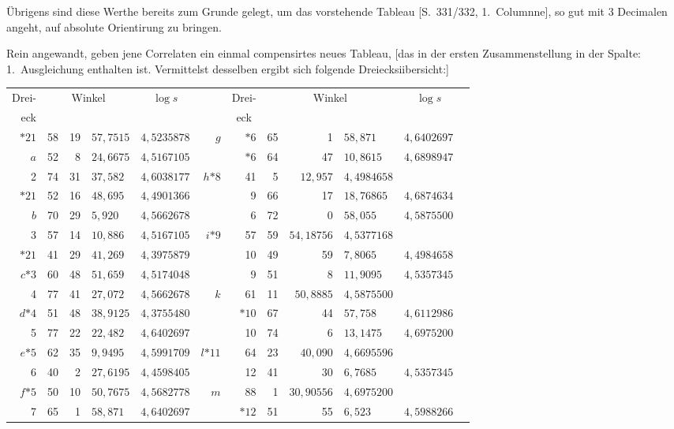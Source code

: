 \documentclass[12pt,a4paper]{article}
\theoremstyle{plain}
\theoremstyle{definition}
\theoremstyle{remark}
\begin{document}
\"Ubrigens sind diese Werthe bereits zum Grunde gelegt, um das vorstehende Tableau [S.\ 331/332, 1.\ Columnne], so gut mit 3 Decimalen angeht, auf absolute Orientirung zu bringen.

Rein angewandt, geben jene Correlaten ein einmal compensirtes neues Tableau, [das in der ersten Zusammenstellung in der Spalte: \glqq{}1.\ Ausgleichung\grqq{} enthalten ist. Vermittelst desselben ergibt sich folgende Dreiecksiibersicht:]

\newpage
\begin{center}
\begin{tabular}{r|r@{${}^{\circ}$}r@{${}'$}l|l|r||r|r@{${}^{\circ}$}r@{${}'$}l|l|r}
Drei- & \multicolumn{3}{c|}{Winkel} & \multicolumn{1}{c||}{$\log s$} & & Drei- & \multicolumn{3}{c|}{Winkel} & \multicolumn{1}{c}{$\log s$} & \\
eck & & & & & & \multicolumn{1}{c}{eck} & & & & & \\
\hline
$*21$ & 58 & 19 & $57{,}7515$ & $4{,}5235878$ & $g$ & $*6$ & 65 & 1 & $58{,}871$ & $4{,}6402697$\\
$a$\quad 1 & 52 & 8 & $24{,}6675$ & $4{,}5167105$ &   & $*6$ & 64 & 47 & $10{,}8615$ & $4{,}6898947$\\
  2 & 74 & 31 & $37{,}582$ & $4{,}6038177$ & $h$\quad $*8$ & 41 & 5 & $12{,}957$ & $4{,}4984658$\\
\hline
$*21$ & 52 & 16 & $48{,}695$ & $4{,}4901366$ &   & 9 & 66 & 17 & $18{,}76865$ & $4{,}6874634$\\
$b$\quad 2 & 70 & 29 & $5{,}920$ & $4{,}5662678$ &   & 6 & 72 & 0 & $58{,}055$ & $4{,}5875500$\\
  3 & 57 & 14 & $10{,}886$ & $4{,}5167105$ & $i$\quad $*9$ & 57 & 59 & $54{,}18756$ & $4{,}5377168$\\
\hline
$*21$ & 41 & 29 & $41{,}269$ & $4{,}3975879$ &   & 10 & 49 & 59 & $7{,}8065$ & $4{,}4984658$\\
$c$\quad $*3$ & 60 & 48 & $51{,}659$ & $4{,}5174048$ &   & 9 & 51 & 8 & $11{,}9095$ & $4{,}5357345$\\
  4 & 77 & 41 & $27{,}072$ & $4{,}5662678$ & $k$\quad 11 & 61 & 11 & $50{,}8885$ & $4{,}5875500$\\
\hline
$d$\quad $*4$ & 51 & 48 & $38{,}9125$ & $4{,}3755480$ &   & $*10$ & 67 & 44 & $57{,}758$ & $4{,}6112986$\\
  5 & 77 & 22 & $22{,}482$ & $4{,}6402697$ &   & 10 & 74 & 6 & $13{,}1475$ & $4{,}6975200$\\
$e$\quad $*5$ & 62 & 35 & $9{,}9495$ & $4{,}5991709$ & $l$\quad $*11$ & 64 & 23 & $40{,}090$ & $4{,}6695596$\\
  6 & 40 & 2 & $27{,}6195$ & $4{,}4598405$ &   & 12 & 41 & 30 & $6{,}7685$ & $4{,}5357345$\\
\hline
$f$\quad $*5$ & 50 & 10 & $50{,}7675$ & $4{,}5682778$ & $m$\quad 13 & 88 & 1 & $30{,}90556$ & $4{,}6975200$\\
  7 & 65 & 1 & $58{,}871$ & $4{,}6402697$ &   & $*12$ & 51 & 55 & $6{,}523$ & $4{,}5988266$
\end{tabular}
\end{center}
\end{document}
